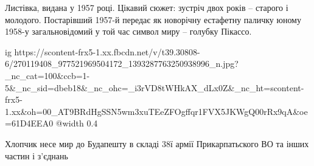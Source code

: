  
 
 
 
 


Листівка, видана у 1957 році. Цікавий сюжет: зустріч двох років – старого і
молодого. Постарівший 1957-й передає як новорічну естафетну паличку юному
1958-у загальновідомий у той час символ миру – голубку Пікассо.

\ifcmt
  ig https://scontent-frx5-1.xx.fbcdn.net/v/t39.30808-6/270119408_977521969504172_1393287763250938996_n.jpg?_nc_cat=100&ccb=1-5&_nc_sid=dbeb18&_nc_ohc=_i3rVD8tWHkAX_dLx0Z&_nc_ht=scontent-frx5-1.xx&oh=00_AT9BRdHgSSN5wm3xuTEeZFOgffqr1FVX5JKWgQ00rRx9qA&oe=61D4EEA0
  @width 0.4
\fi


Хлопчик несе мир до Будапешту в складі 38ї армії Прикарпатьского ВО та інших
частин і з'єднань
